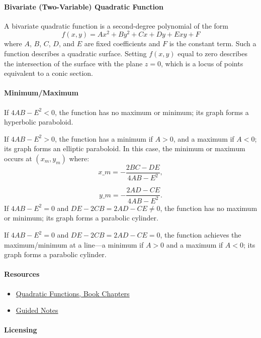 \paragraph{Bivariate (Two-Variable) Quadratic Function}

A bivariate quadratic function is a second-degree polynomial of the form
$$
f(x, y) = Ax^2 + By^2 + Cx + Dy + Exy + F
$$
where $A$, $B$, $C$, $D$, and $E$ are fixed coefficients and $F$ is the constant term. Such a function describes a quadratic surface. Setting $f(x, y)$ equal to zero describes the intersection of the surface with the plane $z = 0$, which is a locus of points equivalent to a conic section.

\paragraph{Minimum/Maximum}

If $4AB - E^2 < 0$, the function has no maximum or minimum; its graph forms a hyperbolic paraboloid.

If $4AB - E^2 > 0$, the function has a minimum if $A > 0$, and a maximum if $A < 0$; its graph forms an elliptic paraboloid. In this case, the minimum or maximum occurs at $(x_m, y_m)$ where:
$$
x\_m = -\frac{2BC - DE}{4AB - E^2},
$$

$$
y\_m = -\frac{2AD - CE}{4AB - E^2}.
$$
If $4AB - E^2 = 0$ and $DE - 2CB = 2AD - CE \neq 0$, the function has no maximum or minimum; its graph forms a parabolic cylinder.

If $4AB - E^2 = 0$ and $DE - 2CB = 2AD - CE = 0$, the function achieves the maximum/minimum at a line—a minimum if $A > 0$ and a maximum if $A < 0$; its graph forms a parabolic cylinder.

\paragraph{Resources}

\begin{itemize}
    \item \href{https://mathresearch.utsa.edu/wikiFiles/MAT1053/Quadratic_Functions/MAT1053_M2.2Quadratic_Functions.pdf}{Quadratic Functions, Book Chapters}
    \item \href{https://mathresearch.utsa.edu/wikiFiles/MAT1053/Quadratic_Functions/MAT1053_M2.2Quadratic_FunctionsGN.pdf}{Guided Notes}
\end{itemize}

\paragraph{Licensing}

